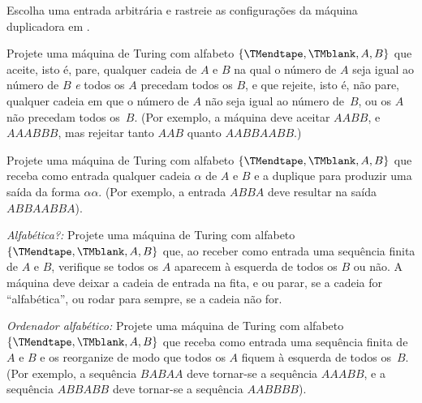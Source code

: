 \documentclass[../../../include/open-logic-section]{subfiles}
\begin{document}
\begin{prob}
Escolha uma entrada arbitrária e rastreie as configurações da
máquina duplicadora em .
\end{prob}

\begin{prob}
Projete uma máquina de Turing com alfabeto $\{\TMendtape,\TMblank, A, B\}$
que aceite, isto é, pare, qualquer cadeia de $A$ e $B$ na qual o
número de $A$ seja igual ao número de $B$ \emph{e} todos os
$A$ precedam todos os $B$, e que rejeite, isto é, não pare, qualquer
cadeia em que o número de $A$ não seja igual ao número de~$B$, ou
os $A$ não precedam todos os~$B$. (Por exemplo, a máquina deve aceitar
$AABB$, e $AAABBB$, mas rejeitar tanto $AAB$ quanto $AABBAABB$.)
\end{prob}

\begin{prob}
Projete uma máquina de Turing com alfabeto $\{\TMendtape,\TMblank, A, B\}$
que receba como entrada qualquer cadeia $\alpha$ de $A$ e $B$ e
a duplique para produzir uma saída da forma $\alpha\alpha$. (Por exemplo,
a entrada $ABBA$ deve resultar na saída $ABBAABBA$).
\end{prob}

\begin{prob}
\emph{Alfabética?:} Projete uma máquina de Turing com alfabeto
$\{\TMendtape,\TMblank, A, B\}$ que, ao receber como entrada uma sequência
finita de $A$ e $B$, verifique se todos os $A$ aparecem à
esquerda de todos os $B$ ou não. A máquina deve deixar a cadeia de
entrada na fita, e ou parar, se a cadeia for
``alfabética'', ou rodar para sempre, se a cadeia não for.
\end{prob}

\begin{prob}
\emph{Ordenador alfabético:} Projete uma máquina de Turing com alfabeto
$\{\TMendtape,\TMblank, A, B\}$ que receba como entrada uma sequência finita
de $A$ e $B$ e os reorganize de modo que todos os $A$ fiquem à
esquerda de todos os~$B$. (Por exemplo, a sequência $BABAA$ deve tornar-se a
sequência $AAABB$, e a sequência $ABBABB$ deve tornar-se a sequência
$AABBBB$).
\end{prob}
\end{document}
